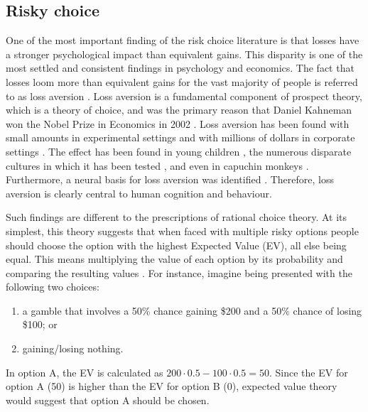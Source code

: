 \documentclass[a4paper, nobind, dvipsnames]{templates/ociamthesis}
\providecommand{\tightlist}{%
  \setlength{\itemsep}{0pt}\setlength{\parskip}{0pt}}
\theoremstyle{definition}
\theoremstyle{definition}
\theoremstyle{definition}
\theoremstyle{definition}
\theoremstyle{remark}
\begin{document}
\hypertarget{risky-choice}{%
\subsection{Risky choice}\label{risky-choice}}

One of the most important finding of the risk choice literature is that losses
have a stronger psychological impact than equivalent gains. This disparity is
one of the most settled and consistent findings in psychology and economics. The
fact that losses loom more than equivalent gains for the vast majority of people
is referred to as loss aversion \autocite{kahneman1979}. Loss aversion is a fundamental
component of prospect theory, which is a theory of choice, and was the primary
reason that Daniel Kahneman won the Nobel Prize in Economics in 2002
\autocite{kahneman2003}. Loss aversion has been found with small amounts in experimental
settings \autocite{kahneman1979,tversky1992} and with millions of dollars in corporate
settings \autocite{koller2012,swalm1966}. The effect has been found in young children
\autocite{harbaugh2001}, the numerous disparate cultures in which it has been tested
\autocite{weber1998}, and even in capuchin monkeys \autocite{chen2006a}. Furthermore, a neural
basis for loss aversion was identified \autocite{tom2007}. Therefore, loss aversion is
clearly central to human cognition and behaviour.

Such findings are different to the prescriptions of rational choice theory. At
its simplest, this theory suggests that when faced with multiple risky options
people should choose the option with the highest Expected Value (EV), all else
being equal. This means multiplying the value of each option by its probability
and comparing the resulting values \autocite[first documented in][]{pascal1999}. For
instance, imagine being presented with the following two choices:

\begin{enumerate}
\def\labelenumi{\Alph{enumi})}
\tightlist
\item
  a gamble that involves a 50\% chance gaining \$200 and a 50\% chance of losing
  \$100; or
\item
  gaining/losing nothing.
\end{enumerate}

In option A, the EV is calculated as \(200 \cdot 0.5 - 100 \cdot 0.5 = 50\). Since
the EV for option A (50) is higher than the EV for option B (0), expected value
theory would suggest that option A should be chosen.
\end{document}
